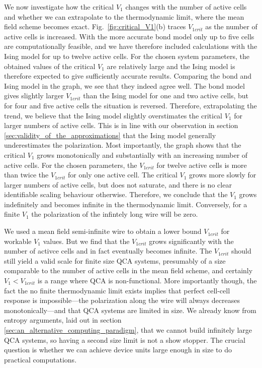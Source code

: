 We now investigate how the critical $V_1$ changes with the number of active
cells and whether we can extrapolate to the thermodynamic limit, where the mean
field scheme becomes exact. Fig.~\ref{fig:critical_V1}(b) traces $V_{1crit}$ as
the number of active cells is increased. With the more accurate bond model only
up to five cells are computationally feasible, and we have therefore included
calculations with the Ising model for up to twelve active cells. For the chosen
system parameters, the obtained values of the critical $V_1$ are relatively
large and the Ising model is therefore expected to give sufficiently accurate
results. Comparing the bond and Ising model in the graph, we see that they
indeed agree well. The bond model gives slightly larger $V_{1crit}$ than the
Ising model for one and two active cells, but for four and five active cells the
situation is reversed. Therefore, extrapolating the trend, we believe that the
Ising model slightly overstimates the critical $V_1$ for larger numbers of
active cells. This is in line with our observation in section
\ref{sec:validity_of_the_approximations} that the Ising model generally
underestimates the polarization. Most importantly, the graph shows that the
critical $V_1$ grows monotonically and substantially with an increasing number
of active cells. For the chosen parameters, the $V_{1crit}$ for twelve active
cells is more than twice the $V_{1crit}$ for only one active cell. The critical
$V_1$ grows more slowly for larger numbers of active cells, but does not
saturate, and there is no clear identifiable scaling behaviour otherwise.
Therefore, we conclude that the $V_1$ grows indefinitely and becomes infinite in
the thermodynamic limit. Conversely, for a finite $V_1$ the polarization of the
infintely long wire will be zero.

We used a mean field semi-infinite wire to obtain a lower bound $V_{1crit}$ for
workable $V_1$ values. But we find that the $V_{1crit}$ grows significantly with
the number of activce cells and in fact eventually becomes infinite. The
$V_{1crit}$ should still yield a valid scale for finite size QCA systems,
presumably of a size comparable to the number of active cells in the mean field
scheme, and certainly $V_1 < V_{1crit}$ is a range where QCA is non-functional.
More importantly though, the fact the no finite thermodynamic limit exists
implies that perfect cell-cell response is impossible---the polarization along
the wire will always decreases monotonically---and that QCA systems are limited
in size. We already know from entropy arguments, laid out in section
\ref{sec:an_alternative_computing_paradigm}, that we cannot build infinitely
large QCA systems, so having a second size limit is not a show stopper. The
crucial question is whether we can achieve device units large enough in size to
do practical computations.

